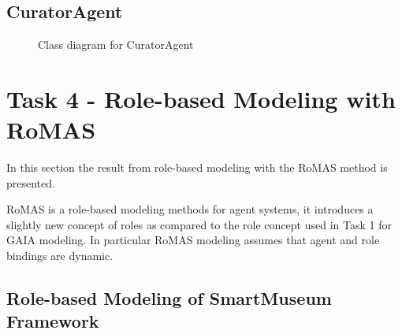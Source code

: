 \documentclass[paper=letter, fontsize=12pt]{article}
\begin{document}
\subsection{CuratorAgent}
\begin{figure}[H]
  \begin{center}
    \caption{Class diagram for CuratorAgent}
    \label{fig:curator_class}
  \end{center}
\end{figure}

\section{Task 4 - Role-based Modeling with RoMAS}
In this section the result from role-based modeling with the RoMAS \citep{romas} method is presented. 

RoMAS is a role-based modeling methods for agent systems, it introduces a slightly new concept of roles as compared to the role concept used in Task 1 for GAIA modeling. In particular RoMAS modeling assumes that agent and role bindings are dynamic.
\subsection{Role-based Modeling of SmartMuseum Framework}
\end{document}
